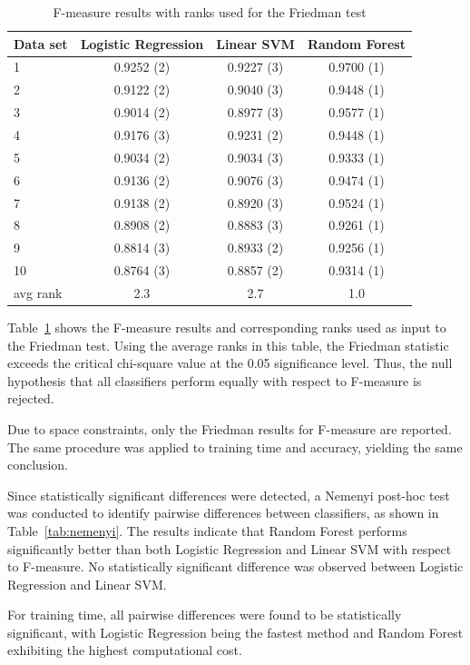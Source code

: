 \documentclass[conference]{IEEEtran}
\begin{document}
\begin{table}[t]
\centering
\caption{F-measure results with ranks used for the Friedman test}
\label{tab:friedman_fmeasure}
\begin{tabular}{@{}lccc@{}}
\toprule
Data set & Logistic Regression & Linear SVM & Random Forest \\
\midrule
1  & 0.9252 (2) & 0.9227 (3) & 0.9700 (1) \\
2  & 0.9122 (2) & 0.9040 (3) & 0.9448 (1) \\
3  & 0.9014 (2) & 0.8977 (3) & 0.9577 (1) \\
4  & 0.9176 (3) & 0.9231 (2) & 0.9448 (1) \\
5  & 0.9034 (2) & 0.9034 (3) & 0.9333 (1) \\
6  & 0.9136 (2) & 0.9076 (3) & 0.9474 (1) \\
7  & 0.9138 (2) & 0.8920 (3) & 0.9524 (1) \\
8  & 0.8908 (2) & 0.8883 (3) & 0.9261 (1) \\
9  & 0.8814 (3) & 0.8933 (2) & 0.9256 (1) \\
10 & 0.8764 (3) & 0.8857 (2) & 0.9314 (1) \\
\midrule
avg rank & 2.3 & 2.7 & 1.0 \\
\bottomrule
\end{tabular}
\end{table}

Table~\ref{tab:friedman_fmeasure} shows the F-measure results and corresponding ranks used as input to the Friedman test.
Using the average ranks in this table, the Friedman statistic exceeds the critical chi-square value at the 0.05 significance level.
Thus, the null hypothesis that all classifiers perform equally with respect to F-measure is rejected.

Due to space constraints, only the Friedman results for F-measure are reported.
The same procedure was applied to training time and accuracy, yielding the same conclusion.

Since statistically significant differences were detected, a Nemenyi post-hoc test was conducted to identify pairwise differences 
between classifiers, as shown in Table~\ref{tab:nemenyi}. The results indicate that Random Forest performs significantly better than 
both Logistic Regression and Linear SVM with respect to F-measure. No statistically significant difference was observed between 
Logistic Regression and Linear SVM.

For training time, all pairwise differences were found to be statistically significant, with Logistic Regression being the fastest 
method and Random Forest exhibiting the highest computational cost.
\end{document}

